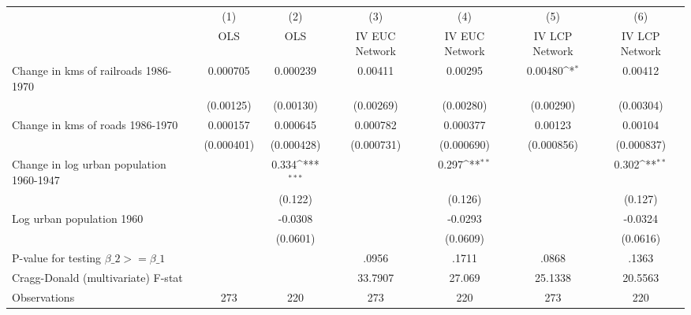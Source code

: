 {
\def\sym#1{\ifmmode^{#1}\else\(^{#1}\)\fi}
\begin{tabular}{l*{6}{c}}
\hline\hline
                &\multicolumn{1}{c}{(1)}&\multicolumn{1}{c}{(2)}&\multicolumn{1}{c}{(3)}&\multicolumn{1}{c}{(4)}&\multicolumn{1}{c}{(5)}&\multicolumn{1}{c}{(6)}\\
                &\multicolumn{1}{c}{OLS}&\multicolumn{1}{c}{OLS}&\multicolumn{1}{c}{IV EUC Network}&\multicolumn{1}{c}{IV EUC Network}&\multicolumn{1}{c}{IV LCP Network}&\multicolumn{1}{c}{IV LCP Network}\\
\hline
Change in kms of railroads 1986-1970& 0.000705         & 0.000239         &  0.00411         &  0.00295         &  0.00480\sym{*}  &  0.00412         \\
                &(0.00125)         &(0.00130)         &(0.00269)         &(0.00280)         &(0.00290)         &(0.00304)         \\
[1em]
Change in kms of roads 1986-1970& 0.000157         & 0.000645         & 0.000782         & 0.000377         &  0.00123         &  0.00104         \\
                &(0.000401)         &(0.000428)         &(0.000731)         &(0.000690)         &(0.000856)         &(0.000837)         \\
[1em]
Change in log urban population 1960-1947&                  &    0.334\sym{***}&                  &    0.297\sym{**} &                  &    0.302\sym{**} \\
                &                  &  (0.122)         &                  &  (0.126)         &                  &  (0.127)         \\
[1em]
Log urban population 1960&                  &  -0.0308         &                  &  -0.0293         &                  &  -0.0324         \\
                &                  & (0.0601)         &                  & (0.0609)         &                  & (0.0616)         \\
\hline
P-value for testing $\beta\_{2} >= \beta\_{1}$&                  &                  &    .0956         &    .1711         &    .0868         &    .1363         \\
Cragg-Donald (multivariate) F-stat&                  &                  &  33.7907         &   27.069         &  25.1338         &  20.5563         \\
Observations    &      273         &      220         &      273         &      220         &      273         &      220         \\
\hline\hline
\end{tabular}
}
